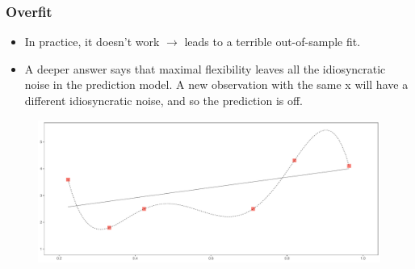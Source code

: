 \documentclass[
  shownotes,
  xcolor={svgnames},
  hyperref={colorlinks,citecolor=DarkBlue,linkcolor=DarkRed,urlcolor=DarkBlue}
  , aspectratio=169]{beamer}
\begin{document}
\begin{frame}[fragile]
\frametitle{Overfit}

\begin{itemize} 
  \item In practice, it doesn't work $\rightarrow$ leads to a terrible out-of-sample fit.
  \item  A deeper answer says that maximal flexibility leaves all the idiosyncratic noise in the prediction model. A new observation with the same x will have a different idiosyncratic noise, and so the prediction is off.
  
\end{itemize}
        \begin{figure}[H] \centering
            \captionsetup{justification=centering}
              \includegraphics[scale=0.4]{figures/fig_1h.pdf}
 \end{figure}



\end{frame}



\end{document}
